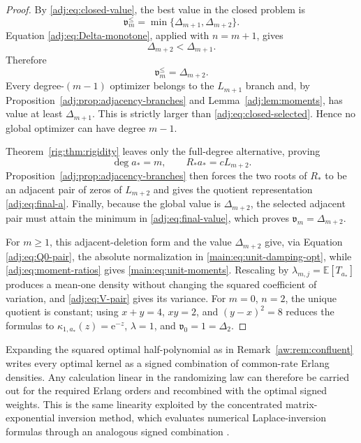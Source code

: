 \documentclass[11pt]{article}
\numberwithin{equation}{section}
\theoremstyle{definition}
\theoremstyle{remark}
\newcommand{\E}{\mathbb E}
\newcommand{\Lag}{L}
\newcommand{\e}{\mathrm e}
\begin{document}
\begin{proof}
By \eqref{adj:eq:closed-value}, the best value in the closed problem is
\[
 \mathfrak v_m^{\leq}=\min\{\Delta_{m+1},\Delta_{m+2}\}.
\]
Equation \eqref{adj:eq:Delta-monotone}, applied with $n=m+1$, gives
\[
 \Delta_{m+2}<\Delta_{m+1}.
\]
Therefore
\begin{equation}\label{adj:eq:closed-selected}
 \mathfrak v_m^{\leq}=\Delta_{m+2}.
\end{equation}
Every degree-$(m-1)$ optimizer belongs to the $\Lag_{m+1}$ branch and, by Proposition~\ref{adj:prop:adjacency-branches} and Lemma~\ref{adj:lem:moments}, has value at least $\Delta_{m+1}$. This is strictly larger than \eqref{adj:eq:closed-selected}. Hence no global optimizer can have degree $m-1$.

Theorem~\ref{rig:thm:rigidity} leaves only the full-degree alternative, proving
\[
 \deg a_*=m,
 \qquad
 R_*a_*=c\Lag_{m+2}.
\]
Proposition~\ref{adj:prop:adjacency-branches} then forces the two roots of $R_*$ to be an adjacent pair of zeros of $\Lag_{m+2}$ and gives the quotient representation \eqref{adj:eq:final-a}. Finally, because the global value is $\Delta_{m+2}$, the selected adjacent pair must attain the minimum in \eqref{adj:eq:final-value}, which proves $\mathfrak v_m=\Delta_{m+2}$.

For $m\geq1$, this adjacent-deletion form and the value $\Delta_{m+2}$ give, via Equation \eqref{adj:eq:Q0-pair}, the absolute
normalization in \eqref{main:eq:unit-damping-opt}, while
\eqref{adj:eq:moment-ratios} gives \eqref{main:eq:unit-moments}. Rescaling by
$\lambda_{m,j}=\E[T_{a_*}]$ produces a mean-one density without changing the
squared coefficient of variation, and \eqref{adj:eq:V-pair} gives its
variance. For $m=0$, $n=2$, the unique quotient is constant; using
$x+y=4$, $xy=2$, and $(y-x)^2=8$ reduces the formulas to
$\kappa_{1,a_*}(z)=\e^{-z}$, $\lambda=1$, and $\mathfrak v_0=1=\Delta_2$.
\end{proof}

Expanding the squared optimal half-polynomial as in
Remark~\ref{aw:rem:confluent} writes every optimal kernel as a signed
combination of common-rate Erlang densities. Any calculation linear in the
randomizing law can therefore be carried out for the required Erlang orders
and recombined with the optimal signed weights. This is the
same linearity exploited by the concentrated matrix-exponential inversion
method, which evaluates numerical Laplace-inversion formulas through an
analogous signed combination
\cite{horvathtalyigastelek2018,horvathetal2020nilt,almousaetal2022cme}.
\end{document}
